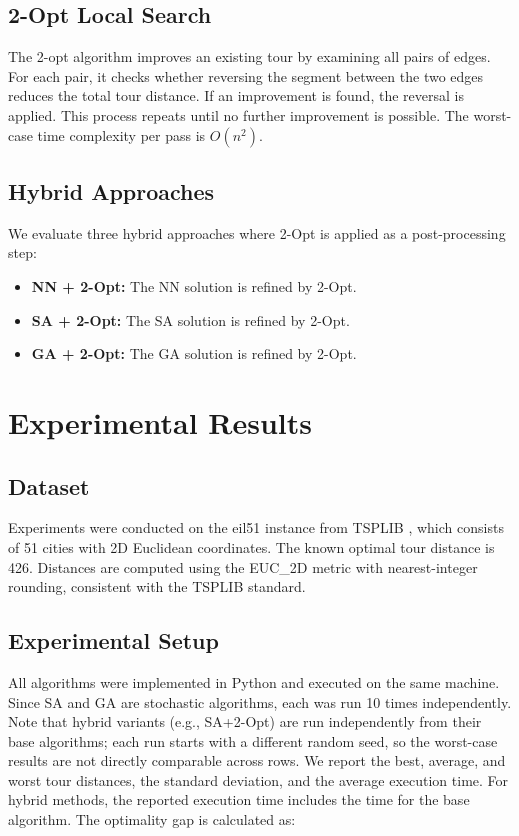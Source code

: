\documentclass[conference]{IEEEtran}
\begin{document}
\subsection{2-Opt Local Search}
The 2-opt algorithm improves an existing tour by examining all pairs of edges. For each pair, it checks whether reversing the segment between the two edges reduces the total tour distance. If an improvement is found, the reversal is applied. This process repeats until no further improvement is possible. The worst-case time complexity per pass is $O(n^2)$.

\subsection{Hybrid Approaches}
We evaluate three hybrid approaches where 2-Opt is applied as a post-processing step:
\begin{itemize}
    \item \textbf{NN + 2-Opt:} The NN solution is refined by 2-Opt.
    \item \textbf{SA + 2-Opt:} The SA solution is refined by 2-Opt.
    \item \textbf{GA + 2-Opt:} The GA solution is refined by 2-Opt.
\end{itemize}

\section{Experimental Results}

\subsection{Dataset}
Experiments were conducted on the eil51 instance from TSPLIB \cite{reinelt1991}, which consists of 51 cities with 2D Euclidean coordinates. The known optimal tour distance is 426. Distances are computed using the EUC\_2D metric with nearest-integer rounding, consistent with the TSPLIB standard.

\subsection{Experimental Setup}
All algorithms were implemented in Python and executed on the same machine. Since SA and GA are stochastic algorithms, each was run 10 times independently. Note that hybrid variants (e.g., SA+2-Opt) are run independently from their base algorithms; each run starts with a different random seed, so the worst-case results are not directly comparable across rows. We report the best, average, and worst tour distances, the standard deviation, and the average execution time. For hybrid methods, the reported execution time includes the time for the base algorithm. The optimality gap is calculated as:
\end{document}
